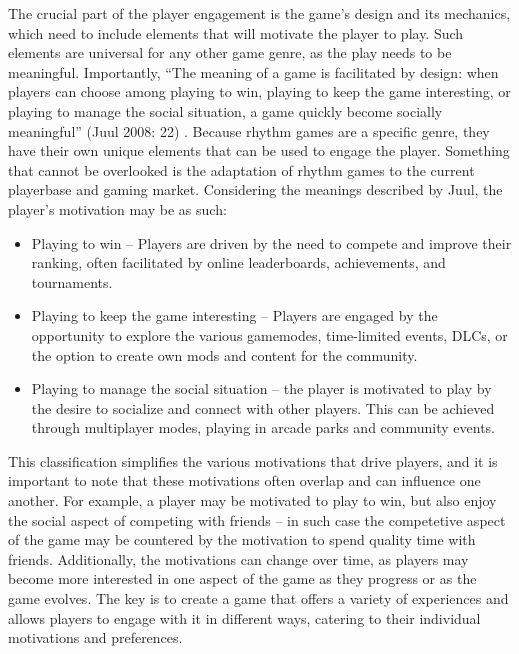 The crucial part of the player engagement is the game’s design and its mechanics, which need to include elements that will motivate the player to play. Such elements are universal for any other game genre, as the play needs to be meaningful. Importantly, “The meaning of a game is facilitated by design: when players can choose among playing to win, playing to keep the game interesting, or playing to manage the social situation, a game quickly become socially meaningful” (Juul 2008: 22) \cite{casualrevolution}. Because rhythm games are a specific genre, they have their own unique elements that can be used to engage the player. Something that cannot be overlooked is the adaptation of rhythm games to the current playerbase and gaming market. Considering the meanings described by Juul, the player’s motivation may be as such:
\begin{itemize}
\item Playing to win -- Players are driven by the need to compete and improve their ranking, often facilitated by online leaderboards, achievements, and tournaments.
\item Playing to keep the game interesting -- Players are engaged by the opportunity to explore the various gamemodes, time-limited events, DLCs, or the option to create own mods and content for the community.
\item Playing to manage the social situation -- the player is motivated to play by the desire to socialize and connect with other players. This can be achieved through multiplayer modes, playing in arcade parks and community events.
\end{itemize}

This classification simplifies the various motivations that drive players, and it is important to note that these motivations often overlap and can influence one another. For example, a player may be motivated to play to win, but also enjoy the social aspect of competing with friends -- in such case the competetive aspect of the game may be countered by the motivation to spend quality time with friends. Additionally, the motivations can change over time, as players may become more interested in one aspect of the game as they progress or as the game evolves. The key is to create a game that offers a variety of experiences and allows players to engage with it in different ways, catering to their individual motivations and preferences.

